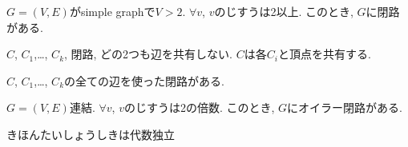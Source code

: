 
\begin{prop}
  $G=(V,E)$がsimple graphで$V>2$.
  $\forall v$, $v$のじすうは2以上.
  このとき, $G$に閉路がある.
\end{prop}

\begin{prop}
  $C$, $C_1$,\ldots, $C_k$, 閉路, どの2つも辺を共有しない.
  $C$は各$C_i$と頂点を共有する.

  $C$, $C_1$,\ldots, $C_k$の全ての辺を使った閉路がある.
\end{prop}


\begin{prop}
  $G=(V,E)$連結.
  $\forall v$, $v$のじすうは2の倍数.
  このとき, $G$にオイラー閉路がある.
\end{prop}



\begin{prop}
きほんたいしょうしきは代数独立
\end{prop}

